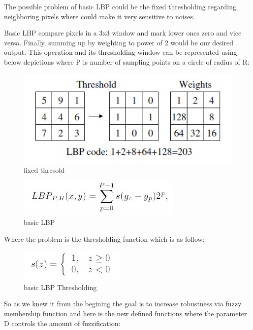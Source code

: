 \documentclass[11pt]{article}
\makeatletter
\def\maxwidth{\ifdim\Gin@nat@width>\linewidth\linewidth
    \else\Gin@nat@width\fi}
\let\Oldincludegraphics\includegraphics
\renewcommand{\includegraphics}[1]{\Oldincludegraphics[width=.8\maxwidth]{#1}}
\makeatother
\begin{document}
The possible problem of basic LBP could be the fixed thresholding
regarding neighboring pixels where could make it very sensitive to
noises.

Basic LBP compare pixels in a 3x3 window and mark lower ones zero and
vice versa. Finally, summing up by weighting to power of 2 would be our
desired output. This operation and its thresholding window can be
represented using below depictions where P is number of sampling points
on a circle of radius of R:

\begin{figure}
\centering
\includegraphics{wiki/3_2_1.jpg}
\caption{fixed thresold}
\end{figure}

\begin{figure}
\centering
\includegraphics{wiki/3_2_2.jpg}
\caption{basic LBP}
\end{figure}

Where the problem is the thresholding function which is as follow:

\begin{figure}
\centering
\includegraphics{wiki/3_2_3.jpg}
\caption{basic LBP Thresholding}
\end{figure}

So as we knew it from the begining the goal is to increase robustness
via fuzzy membership function and here is the new defined functions
where the parameter D controls the amount of fuzzification:
\end{document}
